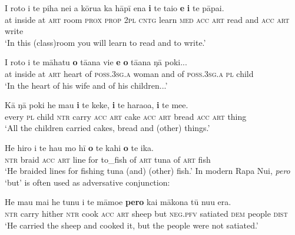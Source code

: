 \ea\label{ex:11.17}
\gll {\ꞌ}I roto i te piha nei a kōrua ka hāpī ena \textbf{i} te tai{\ꞌ}o  \textbf{{\ꞌ}e} \textbf{i} te pāpa{\ꞌ}i.\\
at inside at \textsc{art} room \textsc{prox} \textsc{prop} \textsc{2pl} \textsc{cntg} learn \textsc{med} \textsc{acc} \textsc{art} read  and \textsc{acc} \textsc{art} write\\

\glt 
‘In this (class)room you will learn to read and to write.’ \textstyleExampleref{[R334.043]} 
\z

\ea\label{ex:11.18}
\gll {\ꞌ}I roto i te māhatu \textbf{o} tā{\ꞌ}ana vi{\ꞌ}e \textbf{{\ꞌ}e} \textbf{o} tā{\ꞌ}ana ŋā poki... \\
at inside at \textsc{art} heart of \textsc{poss.3sg.a} woman and of \textsc{poss.3sg.a} \textsc{pl} child \\

\glt 
‘In the heart of his wife and of his children...’ \textstyleExampleref{[R649.087]} 
\z

\ea\label{ex:11.19}
\gll Kā ŋā poki he ma{\ꞌ}u \textbf{i} te keke, \textbf{i} te haraoa, \textbf{i} te me{\ꞌ}e.\\
every \textsc{pl} child \textsc{ntr} carry \textsc{acc} \textsc{art} cake \textsc{acc} \textsc{art} bread \textsc{acc} \textsc{art} thing\\

\glt 
‘All the children carried cakes, bread and (other) things.’ \textstyleExampleref{[R165.001]} 
\z

\ea\label{ex:11.20}
\gll He hiro i te hau mo hī \textbf{o} te kahi \textbf{o} te ika. \\
\textsc{ntr} braid \textsc{acc} \textsc{art} line for to\_fish of \textsc{art} tuna of \textsc{art} fish \\

\glt 
‘He braided lines for fishing tuna (and) (other) fish.’ \textstyleExampleref{[R310.020]}\textstyleExampleref{} 
\z
{}
In modern Rapa Nui,  \textit{pero} ‘but’ is often used as adversative conjunction: 

\ea\label{ex:11.21}
\gll He ma{\ꞌ}u mai he tunu i te māmoe \textbf{pero} kai mākona tū nu{\ꞌ}u era.\\
\textsc{ntr} carry hither \textsc{ntr} cook \textsc{acc} \textsc{art} sheep but \textsc{neg.pfv} satiated \textsc{dem} people \textsc{dist}\\

\glt
‘He carried the sheep and cooked it, but the people were not satiated.’ \textstyleExampleref{[R183.033]} 
\z

